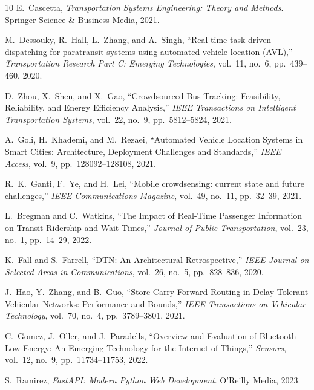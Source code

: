 \documentclass[lettersize,journal]{IEEEtran}
\begin{document}
\begin{thebibliography}{10}
E.~Cascetta, \textit{Transportation Systems Engineering: Theory and Methods}. Springer Science \& Business Media, 2021.

M.~Dessouky, R.~Hall, L.~Zhang, and A.~Singh, ``Real-time task-driven dispatching for paratransit systems using automated vehicle location (AVL),'' \textit{Transportation Research Part C: Emerging Technologies}, vol.~11, no.~6, pp.~439--460, 2020.

D.~Zhou, X.~Shen, and X.~Gao, ``Crowdsourced Bus Tracking: Feasibility, Reliability, and Energy Efficiency Analysis,'' \textit{IEEE Transactions on Intelligent Transportation Systems}, vol.~22, no.~9, pp.~5812--5824, 2021.

A.~Goli, H.~Khademi, and M.~Rezaei, ``Automated Vehicle Location Systems in Smart Cities: Architecture, Deployment Challenges and Standards,'' \textit{IEEE Access}, vol.~9, pp.~128092--128108, 2021.

R.~K.~Ganti, F.~Ye, and H.~Lei, ``Mobile crowdsensing: current state and future challenges,'' \textit{IEEE Communications Magazine}, vol.~49, no.~11, pp.~32--39, 2021.

L.~Bregman and C.~Watkins, ``The Impact of Real-Time Passenger Information on Transit Ridership and Wait Times,'' \textit{Journal of Public Transportation}, vol.~23, no.~1, pp.~14--29, 2022.

K.~Fall and S.~Farrell, ``DTN: An Architectural Retrospective,'' \textit{IEEE Journal on Selected Areas in Communications}, vol.~26, no.~5, pp.~828--836, 2020.

J.~Hao, Y.~Zhang, and B.~Guo, ``Store-Carry-Forward Routing in Delay-Tolerant Vehicular Networks: Performance and Bounds,'' \textit{IEEE Transactions on Vehicular Technology}, vol.~70, no.~4, pp.~3789--3801, 2021.

C.~Gomez, J.~Oller, and J.~Paradells, ``Overview and Evaluation of Bluetooth Low Energy: An Emerging Technology for the Internet of Things,'' \textit{Sensors}, vol.~12, no.~9, pp.~11734--11753, 2022.

S.~Ramirez, \textit{FastAPI: Modern Python Web Development}. O'Reilly Media, 2023.


\end{thebibliography}
\end{document}
